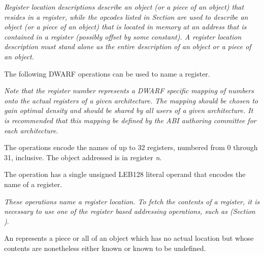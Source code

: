 \textit{Register location descriptions describe an object
(or a piece of an object) that resides in a register, while
the opcodes listed in 
Section 
are used to describe an object (or a piece of
an object) that is located in memory at an address that is
contained in a register (possibly offset by some constant). A
register location description must stand alone as the entire
description of an object or a piece of an object.
}

The following DWARF operations can be used to name a register.


\textit{Note that the register number represents a DWARF specific
mapping of numbers onto the actual registers of a given
architecture. The mapping should be chosen to gain optimal
density and should be shared by all users of a given
architecture. It is recommended that this mapping be defined
by the ABI authoring committee for each architecture.
}
\begin{enumerate}[1. ]
The \DWOPregnTARG{} operations encode the names of up to 32
registers, numbered from 0 through 31, inclusive. The object
addressed is in register \textit{n}.

\itembfnl{\DWOPregxTARG}
The \DWOPregxTARG{} operation has a single 
unsigned LEB128 literal
operand that encodes the name of a register.  

\end{enumerate}

\textit{These operations name a register location. To
fetch the contents of a register, it is necessary to use
one of the register based addressing operations, such as
\DWOPbregx{} 
(Section )}.

An 
represents a piece or all
of an object which has no actual location but whose contents
are nonetheless either known or known to be undefined.

